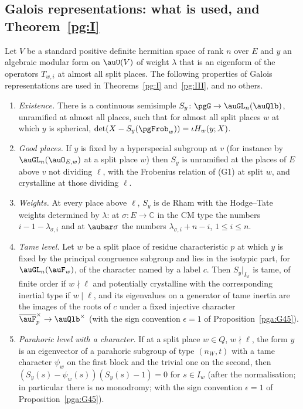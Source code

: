 \documentclass[10pt]{amsart}
\theoremstyle{definition}
\theoremstyle{remark}
\newcommand{\C}{\mathbb C}
\begin{document}
\subsection{Galois representations: what is used, and Theorem~\ref{pg:I}}\label{pg:ss-galois}

Let $V$ be a standard positive definite hermitian space of rank $n$ over $E$ and $y$ an algebraic
modular form on $\auU(V)$ of weight $\lambda$ that is an eigenform of the operators $T_{w,i}$ at
almost all split places. The following properties of Galois representations are used in
Theorems~\ref{pg:I} and~\ref{pg:III}, and no others.
\begin{enumerate}
\item[(G1)] \emph{Existence.} There is a continuous semisimple $S_y\colon\pgG\to\auGL_n(\auQlb)$,
unramified at almost all places, such that for almost all split places $w$ at which $y$ is
spherical, $\det(X-S_y(\pgFrob_w))=\iota H_w(y;X)$.
\item[(G2)] \emph{Good places.} If $y$ is fixed by a hyperspecial subgroup at $v$ (for instance by
$\auGL_n(\auO_{E,w})$ at a split place $w$) then $S_y$ is unramified at the places of $E$ above $v$
not dividing $\ell$, with the Frobenius relation of (G1) at split $w$, and crystalline at those
dividing $\ell$.
\item[(G3)] \emph{Weights.} At every place above $\ell$, $S_y$ is de Rham with the Hodge--Tate
weights determined by $\lambda$: at $\sigma\colon E\to\C$ in the CM type the numbers
$i-1-\lambda_{\sigma,i}$ and at $\aubar\sigma$ the numbers $\lambda_{\sigma,i}+n-i$, $1\le i\le n$.
\item[(G4)] \emph{Tame level.} Let $w$ be a split place of residue characteristic $p$ at which $y$
is fixed by the principal congruence subgroup and lies in the isotypic part, for
$\auGL_n(\auF_w)$, of the character named by a label $c$. Then $S_y|_{I_w}$ is tame, of finite
order if $w\nmid\ell$ and potentially crystalline with the corresponding inertial type if
$w\mid\ell$, and its eigenvalues on a generator of tame inertia are the images of the roots of
$c$ under a fixed injective character $\overline{\auF}_p^\times\to\auQlb^\times$ (with the sign
convention $\epsilon=1$ of Proposition~\ref{pga:G45}).
\item[(G5)] \emph{Parahoric level with a character.} If at a split place $w\in Q$, $w\nmid\ell$,
the form $y$ is an eigenvector of a parahoric subgroup of type $(n_W,t)$ with a tame character
$\psi_w$ on the first block and the trivial one on the second, then $(S_y(s)-\psi_w(s))(S_y(s)-1)
=0$ for $s\in I_w$ (after the normalisation; in particular there is no monodromy; with the sign
convention $\epsilon=1$ of Proposition~\ref{pga:G45}).
\end{enumerate}
\end{document}
